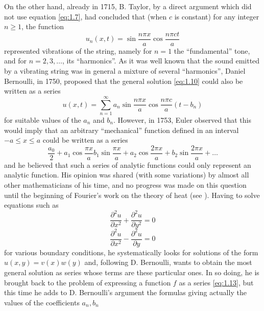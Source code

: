 \documentclass[12pt,a4paper,leqno,twoside]{extbook}
\newcommand{\sub}[1]{\texorpdfstring{\textsubscript{#1}}{#1}}
\begin{document}
On the other hand, already in 1715, B. Taylor, by a direct argument which did not use equation \eqref{eq:1.7}, had concluded that (when \(c\) is constant) for any integer $n \geq 1$, the function
\begin{equation}
    \label{eq:1.11}
    u_n(x,t) = \sin\frac{n\pi x}{a} \cos\frac{n\pi ct}{a}
\end{equation}
represented vibrations of the string, namely for \(n = 1\) the ``fundamental'' tone, and for \(n = 2,3, \ldots\), its ``harmonics''. As it was well known that the sound emitted by a vibrating string was in general a mixture of several ``harmonics'', Daniel Bernoulli, in 1750, proposed that the general solution \eqref{eq:1.10} could also be written as a series
\begin{equation}
    \label{eq:1.12}
    u(x,t) = \sum_{n=1}^\infty a_n \sin\frac{n\pi x}{a} \cos\frac{n\pi c}{a}\left(t - b_n\right)
\end{equation}
for suitable values of the \(a_n\) and \(b_n\). However, in 1753, Euler observed that this would imply that an arbitrary ``mechanical'' function defined in an interval \(-a \leq x \leq a\) could be written as a series
\begin{equation}
    \label{eq:1.13}
    \frac{a_0}{2} + a_1 \cos\frac{\pi x}{a} b_1 \sin\frac{\pi x}{a} + a_2 \cos\frac{2\pi x}{a} + b_2 \sin\frac{2\pi x}{a} + \ldots
\end{equation}
and he believed that such a series of analytic functions could only represent an analytic function. His opinion was shared (with some variations) by almost all other mathematicians of his time, and no progress was made on this question until the beginning of Fourier's work on the theory of heat (see \cite[(2), t.~XI\sub{2}, pp.~273--300]{065}). Having to solve equations such as
\begin{equation}
    \label{eq:1.14}
    \frac{\partial^2 u}{\partial x^2} + \frac{\partial^2 u}{\partial y^2} = 0
\end{equation}
\begin{equation}
    \label{eq:1.15}
    \frac{\partial^2 u}{\partial x^2} - \frac{\partial^2 u}{\partial y} = 0
\end{equation}
for various boundary conditions, he systematically looks for solutions of the form \(u(x,y) = v(x)w(y)\) and, following D. Bernoulli, wants to obtain the most general solution as series whose terms are these particular ones. In so doing, he is brought back to the problem of expressing a function \(f\) as a series \eqref{eq:1.13}, but this time he adds to D. Bernoulli's argument the formulas giving actually the values of the coefficients \(a_n, b_n\)
\end{document}
